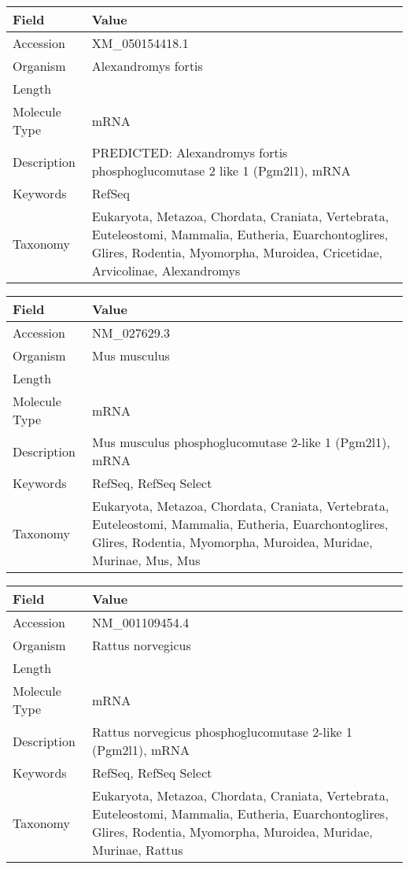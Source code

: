 \documentclass[10pt]{article}
\begin{document}
\vspace{1em}
{\footnotesize
\begin{longtable}{>{\raggedright\arraybackslash}p{4.5cm} >{\raggedright\arraybackslash}p{11.5cm}}
\textbf{Field} & \textbf{Value} \\
\hline
Accession & XM\_050154418.1 \\
Organism & Alexandromys fortis \\
Length & 4327 \\
Molecule Type & mRNA \\
Description & PREDICTED: Alexandromys fortis phosphoglucomutase 2 like 1 (Pgm2l1), mRNA \\
Keywords & RefSeq \\
Taxonomy & Eukaryota, Metazoa, Chordata, Craniata, Vertebrata, Euteleostomi, Mammalia, Eutheria, Euarchontoglires, Glires, Rodentia, Myomorpha, Muroidea, Cricetidae, Arvicolinae, Alexandromys \\
\end{longtable}
}

\vspace{1em}
{\footnotesize
\begin{longtable}{>{\raggedright\arraybackslash}p{4.5cm} >{\raggedright\arraybackslash}p{11.5cm}}
\textbf{Field} & \textbf{Value} \\
\hline
Accession & NM\_027629.3 \\
Organism & Mus musculus \\
Length & 8641 \\
Molecule Type & mRNA \\
Description & Mus musculus phosphoglucomutase 2-like 1 (Pgm2l1), mRNA \\
Keywords & RefSeq, RefSeq Select \\
Taxonomy & Eukaryota, Metazoa, Chordata, Craniata, Vertebrata, Euteleostomi, Mammalia, Eutheria, Euarchontoglires, Glires, Rodentia, Myomorpha, Muroidea, Muridae, Murinae, Mus, Mus \\
\end{longtable}
}

\vspace{1em}
{\footnotesize
\begin{longtable}{>{\raggedright\arraybackslash}p{4.5cm} >{\raggedright\arraybackslash}p{11.5cm}}
\textbf{Field} & \textbf{Value} \\
\hline
Accession & NM\_001109454.4 \\
Organism & Rattus norvegicus \\
Length & 8471 \\
Molecule Type & mRNA \\
Description & Rattus norvegicus phosphoglucomutase 2-like 1 (Pgm2l1), mRNA \\
Keywords & RefSeq, RefSeq Select \\
Taxonomy & Eukaryota, Metazoa, Chordata, Craniata, Vertebrata, Euteleostomi, Mammalia, Eutheria, Euarchontoglires, Glires, Rodentia, Myomorpha, Muroidea, Muridae, Murinae, Rattus \\
\end{longtable}
}
\end{document}
